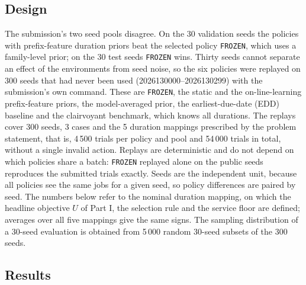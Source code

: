 \subsection{Design}
The submission's two seed pools disagree. On the 30 validation seeds the policies with prefix-feature duration priors beat the selected policy \texttt{FROZEN}, which uses a family-level prior; on the 30 test seeds \texttt{FROZEN} wins. Thirty seeds cannot separate an effect of the environments from seed noise, so the six policies were replayed on 300 seeds that had never been used (2026130000--2026130299) with the submission's own command. These are \texttt{FROZEN}, the static and the on-line-learning prefix-feature priors, the model-averaged prior, the earliest-due-date (EDD) baseline and the clairvoyant benchmark, which knows all durations. The replays cover 300 seeds, 3 cases and the 5 duration mappings prescribed by the problem statement, that is, 4\,500 trials per policy and pool and 54\,000 trials in total, without a single invalid action. Replays are deterministic and do not depend on which policies share a batch: \texttt{FROZEN} replayed alone on the public seeds reproduces the submitted trials exactly. Seeds are the independent unit, because all policies see the same jobs for a given seed, so policy differences are paired by seed. The numbers below refer to the nominal duration mapping, on which the headline objective $U$ of Part I, the selection rule and the service floor are defined; averages over all five mappings give the same signs. The sampling distribution of a 30-seed evaluation is obtained from 5\,000 random 30-seed subsets of the 300 seeds.

\subsection{Results}

